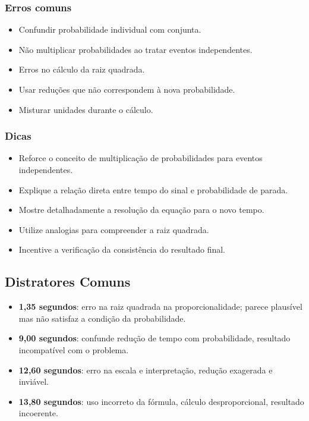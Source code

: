 \documentclass{article}
\begin{document}
\subsubsection*{Erros comuns}
\begin{itemize}
  \item Confundir probabilidade individual com conjunta.
  \item Não multiplicar probabilidades ao tratar eventos independentes.
  \item Erros no cálculo da raiz quadrada.
  \item Usar reduções que não correspondem à nova probabilidade.
  \item Misturar unidades durante o cálculo.
\end{itemize}

\subsubsection*{Dicas}
\begin{itemize}
  \item Reforce o conceito de multiplicação de probabilidades para eventos independentes.
  \item Explique a relação direta entre tempo do sinal e probabilidade de parada.
  \item Mostre detalhadamente a resolução da equação para o novo tempo.
  \item Utilize analogias para compreender a raiz quadrada.
  \item Incentive a verificação da consistência do resultado final.
\end{itemize}

\subsection*{Distratores Comuns}
\begin{itemize}
  \item \textbf{1,35 segundos}: erro na raiz quadrada na proporcionalidade; parece plausível mas não satisfaz a condição da probabilidade.
  \item \textbf{9,00 segundos}: confunde redução de tempo com probabilidade, resultado incompatível com o problema.
  \item \textbf{12,60 segundos}: erro na escala e interpretação, redução exagerada e inviável.
  \item \textbf{13,80 segundos}: uso incorreto da fórmula, cálculo desproporcional, resultado incoerente.
\end{itemize}
\end{document}
